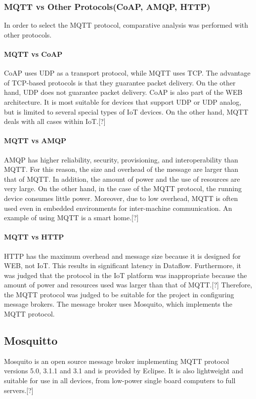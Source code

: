 \documentclass[conference]{IEEEtran}
\begin{document}
\subsubsection{MQTT vs Other Protocols(CoAP, AMQP, HTTP)}
\hfill \break
In order to select the MQTT protocol, comparative analysis was performed with other protocols.

\paragraph{MQTT vs CoAP}\hfill \break
CoAP uses UDP as a transport protocol, while MQTT uses TCP. The advantage of TCP-based protocols is that they guarantee packet delivery. On the other hand, UDP does not guarantee packet delivery. CoAP is also part of the WEB architecture. It is most suitable for devices that support UDP or UDP analog, but is limited to several special types of IoT devices. On the other hand, MQTT deals with all cases within IoT.[?] 

\paragraph{MQTT vs AMQP}
\hfill \break
AMQP has higher reliability, security, provisioning, and interoperability than MQTT. For this reason, the size and overhead of the message are larger than that of MQTT.
In addition, the amount of power and the use of resources are very large. On the other hand, in the case of the MQTT protocol, the running device consumes little power.
Moreover, due to low overhead, MQTT is often used even in embedded environments for inter-machine communication. An example of using MQTT is a smart home.[?]
\paragraph{MQTT vs HTTP}
\hfill \break
HTTP has the maximum overhead and message size because it is designed for WEB, not IoT. This results in significant latency in Dataflow.
Furthermore, it was judged that the protocol in the IoT platform was inappropriate because the amount of power and resources used was larger than that of MQTT.[?]
Therefore, the MQTT protocol was judged to be suitable for the project in configuring message brokers. The message broker uses Mosquito, which implements the MQTT protocol.

\subsection{Mosquitto}
Mosquito is an open source message broker implementing MQTT protocol versions 5.0, 3.1.1 and 3.1 and is provided by Eclipse. It is also lightweight and suitable for use in all devices, from low-power single board computers to full servers.[?]
\end{document}
